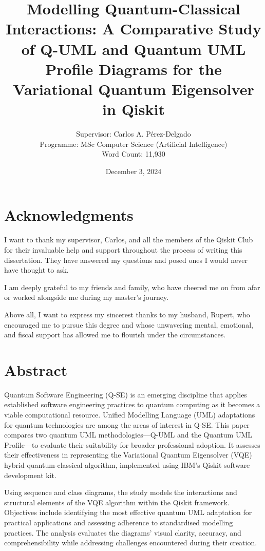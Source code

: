 \documentclass{article}
\title{Modelling Quantum-Classical Interactions: A Comparative Study of Q-UML and Quantum UML Profile Diagrams for the Variational Quantum Eigensolver in Qiskit}
\author{Supervisor: Carlos A. Pérez-Delgado\\ Programme: MSc Computer Science (Artificial Intelligence) \\ Word Count: 11,930}
\date{December 3, 2024}
\begin{document}
\maketitle

\thispagestyle{empty} %

\newpage
\setcounter{page}{1}

\section*{Acknowledgments}

I want to thank my supervisor, Carlos, and all the members of the Qiskit Club for their invaluable help and support throughout the process of writing this dissertation. They have answered my questions and posed ones I would never have thought to ask.

I am deeply grateful to my friends and family, who have cheered me on from afar or worked alongside me during my master’s journey.

Above all, I want to express my sincerest thanks to my husband, Rupert, who encouraged me to pursue this degree and whose unwavering mental, emotional, and fiscal support has allowed me to flourish under the circumstances.

\newpage

\section*{Abstract}

Quantum Software Engineering (Q-SE) is an emerging discipline that applies established software engineering practices to quantum computing as it becomes a viable computational resource. Unified Modelling Language (UML) adaptations for quantum technologies are among the areas of interest in Q-SE. This paper compares two quantum UML methodologies—Q-UML and the Quantum UML Profile—to evaluate their suitability for broader professional adoption. It assesses their effectiveness in representing the Variational Quantum Eigensolver (VQE) hybrid quantum-classical algorithm, implemented using IBM’s Qiskit software development kit.

Using sequence and class diagrams, the study models the interactions and structural elements of the VQE algorithm within the Qiskit framework. Objectives include identifying the most effective quantum UML adaptation for practical applications and assessing adherence to standardised modelling practices. The analysis evaluates the diagrams' visual clarity, accuracy, and comprehensibility while addressing challenges encountered during their creation.
\end{document}
